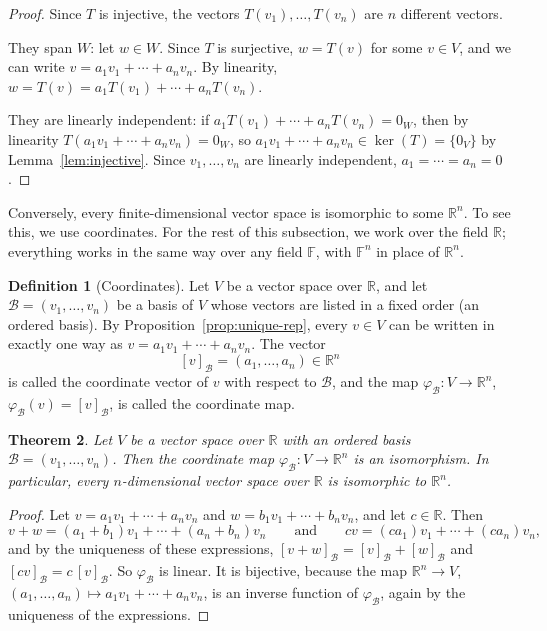 \documentclass[11pt]{article}
\theoremstyle{definition}
\newtheorem{definition}{Definition}[section]
\theoremstyle{plain}
\newtheorem{theorem}[definition]{Theorem}
\theoremstyle{remark}
\begin{document}
\begin{proof}
    Since $T$ is injective, the vectors $T(v_1), \ldots, T(v_n)$ are $n$ different vectors.

    They span $W$: let $w \in W$. Since $T$ is surjective, $w = T(v)$ for some $v \in V$, and we can write $v = a_1 v_1 + \cdots + a_n v_n$. By linearity, $w = T(v) = a_1 T(v_1) + \cdots + a_n T(v_n)$.

    They are linearly independent: if $a_1 T(v_1) + \cdots + a_n T(v_n) = 0_W$, then by linearity $T(a_1 v_1 + \cdots + a_n v_n) = 0_W$, so $a_1 v_1 + \cdots + a_n v_n \in \ker(T) = \{0_V\}$ by Lemma~\ref{lem:injective}. Since $v_1, \ldots, v_n$ are linearly independent, $a_1 = \cdots = a_n = 0$.
\end{proof}

Conversely, every finite-dimensional vector space is isomorphic to some $\mathbb{R}^n$. To see this, we use coordinates. For the rest of this subsection, we work over the field $\mathbb{R}$; everything works in the same way over any field $\mathbb{F}$, with $\mathbb{F}^n$ in place of $\mathbb{R}^n$.

\begin{definition}[Coordinates]\label{def:coordinates}
    Let $V$ be a vector space over $\mathbb{R}$, and let $\mathcal{B} = (v_1, \ldots, v_n)$ be a basis of $V$ whose vectors are listed in a fixed order (an ordered basis). By Proposition~\ref{prop:unique-rep}, every $v \in V$ can be written in exactly one way as $v = a_1 v_1 + \cdots + a_n v_n$. The vector
    \[[v]_{\mathcal{B}} = (a_1, \ldots, a_n) \in \mathbb{R}^n\]
    is called the coordinate vector of $v$ with respect to $\mathcal{B}$, and the map $\varphi_{\mathcal{B}}: V \to \mathbb{R}^n$, $\varphi_{\mathcal{B}}(v) = [v]_{\mathcal{B}}$, is called the coordinate map.
\end{definition}

\begin{theorem}\label{thm:coordinates}
    Let $V$ be a vector space over $\mathbb{R}$ with an ordered basis $\mathcal{B} = (v_1, \ldots, v_n)$. Then the coordinate map $\varphi_{\mathcal{B}}: V \to \mathbb{R}^n$ is an isomorphism. In particular, every $n$-dimensional vector space over $\mathbb{R}$ is isomorphic to $\mathbb{R}^n$.
\end{theorem}

\begin{proof}
    Let $v = a_1 v_1 + \cdots + a_n v_n$ and $w = b_1 v_1 + \cdots + b_n v_n$, and let $c \in \mathbb{R}$. Then
    \[v + w = (a_1 + b_1) v_1 + \cdots + (a_n + b_n) v_n \qquad \text{and} \qquad cv = (c a_1) v_1 + \cdots + (c a_n) v_n,\]
    and by the uniqueness of these expressions, $[v + w]_{\mathcal{B}} = [v]_{\mathcal{B}} + [w]_{\mathcal{B}}$ and $[cv]_{\mathcal{B}} = c\,[v]_{\mathcal{B}}$. So $\varphi_{\mathcal{B}}$ is linear. It is bijective, because the map $\mathbb{R}^n \to V$, $(a_1, \ldots, a_n) \mapsto a_1 v_1 + \cdots + a_n v_n$, is an inverse function of $\varphi_{\mathcal{B}}$, again by the uniqueness of the expressions.
\end{proof}
\end{document}

